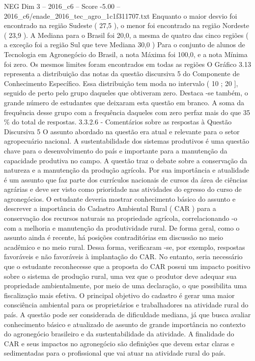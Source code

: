 \begin{textsample}{NEG Dim 3 – 2016\_c6 – Score -5.00 – 2016\_c6/enade\_2016\_tec\_agro\_1c1f311707.txt}
Enquanto o maior desvio foi encontrado na região Sudeste ( 27,5 ), o menor foi encontrado na região Nordeste ( 23,9 ).
A Mediana para o Brasil foi 20,0, a mesma de quatro das cinco regiões ( a exceção foi a região Sul que teve Mediana 30,0 ) Para o conjunto de alunos de Tecnologia em Agronegócio do Brasil, a nota Máxima foi 100,0, e a nota Mínima foi zero.
Os mesmos limites foram encontrados em todas as regiões O Gráfico 3.13 representa a distribuição das notas da questão discursiva 5 do Componente de Conhecimento Específico.
Essa distribuição tem moda no intervalo ( 10 ; 20 ], seguido de perto pelo grupo daqueles que obtiveram zero.
Destaca -se também, o grande número de estudantes que deixaram esta questão em branco.
A soma da frequência desse grupo com a frequência daqueles com zero perfaz mais do que 35 \% do total de respostas. 3.3.2.6 - Comentários sobre as respostas à Questão Discursiva 5 O assunto abordado na questão era atual e relevante para o setor agropecuário nacional.
A sustentabilidade dos sistemas produtivos é uma questão chave para o desenvolvimento do país e importante para a manutenção da capacidade produtiva no campo.
A questão traz o debate sobre a conservação da natureza e a manutenção da produção agrícola.
Por sua importância e atualidade é um assunto que faz parte dos currículos nacionais de cursos da área de ciências agrárias e deve ser visto como prioridade nas atividades do egresso do curso de agronegócios.
O estudante deveria mostrar conhecimento básico do assunto e descrever a importância do Cadastro Ambiental Rural ( CAR ) para a conservação dos recursos naturais na propriedade agrícola, correlacionando -o com a melhoria e manutenção da produtividade rural.
De forma geral, como o assunto ainda é recente, há posições contraditórias em discussão no meio acadêmico e no meio rural.
Dessa forma, verificaram -se, por exemplo, respostas favoráveis e não favoráveis à implantação do CAR.
No entanto, seria necessário que o estudante reconhecesse que a proposta do CAR possui um impacto positivo sobre o sistema de produção rural, uma vez que o produtor deve adequar sua propriedade ambientalmente, por meio de uma declaração, o que possibilita uma fiscalização mais efetiva.
O principal objetivo do cadastro é gerar uma maior consciência ambiental para os proprietários e trabalhadores na atividade rural do país.
A questão pode ser considerada de dificuldade mediana, já que busca avaliar conhecimento básico e atualizado de assunto de grande importância no contexto do agronegócio brasileiro e da sustentabilidade da atividade.
A finalidade do CAR e seus impactos no agronegócio são definições que devem estar claras e sedimentadas para o profissional que vai atuar na atividade rural do país.

\end{textsample}
